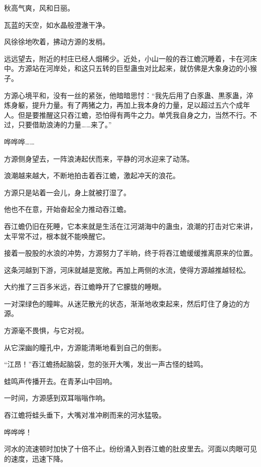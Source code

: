 
\begin{this_body}

秋高气爽，风和日丽。

瓦蓝的天空，如水晶般澄澈干净。

风徐徐地吹着，拂动方源的发梢。

远远望去，附近的村庄已经人烟稀少。近处，小山一般的吞江蟾沉睡着，卡在河床中。方源站在河岸处，和这只五转的巨型蛊虫对比起来，就仿佛是大象身边的小猴子。

方源心境平和，没有一丝的紧张，他暗暗思忖：“我先后用了白豕蛊、黒豕蛊，淬炼身躯，提升力量。有了两猪之力，再加上我本身的力量，足以超过五六个成年人。但是要推醒这只吞江蟾，恐怕得有两牛之力。单凭我自身之力，当然不行。不过，只要借助浪涛的力量……来了。”

哗哗哗……

方源侧身望去，一阵浪涛起伏而来，平静的河水迎来了动荡。

浪潮越来越大，不断地拍击着吞江蟾，激起冲天的浪花。

方源只是站着一会儿，身上就被打湿了。

他也不在意，开始奋起全力推动吞江蟾。

吞江蟾仍旧在死睡，它本来就是生活在江河湖海中的蛊虫，浪潮的打击对它来讲，太平常不过，根本就不能唤醒它。

接着一股股的水浪的冲势，方源努力了半晌，终于将吞江蟾缓缓推离原来的位置。

这条河越到下游，河床就越是宽敞。再加上两侧的水流，使得方源越推越轻松。

大约推了三百多米远，吞江蟾睁开了它朦胧的睡眼。

一对深绿色的瞳眸。从迷茫散光的状态，渐渐地收束起来，然后盯住了身边的方源。

方源毫不畏惧，与它对视。

从它深幽的瞳孔中，方源能清晰地看到自己的倒影。

“江昂！”吞江蟾扬起脑袋，忽的张开大嘴，发出一声古怪的蛙鸣。

蛙鸣声传播开去。在青茅山中回响。

一时间，方源感到双耳嗡嗡作响。

吞江蟾将蛙头垂下，大嘴对准冲刷而来的河水猛吸。

哗哗哗！

河水的流速顿时加快了十倍不止。纷纷涌入到吞江蟾的肚皮里去。河面以肉眼可见的速度，迅速下降。


\end{this_body}
